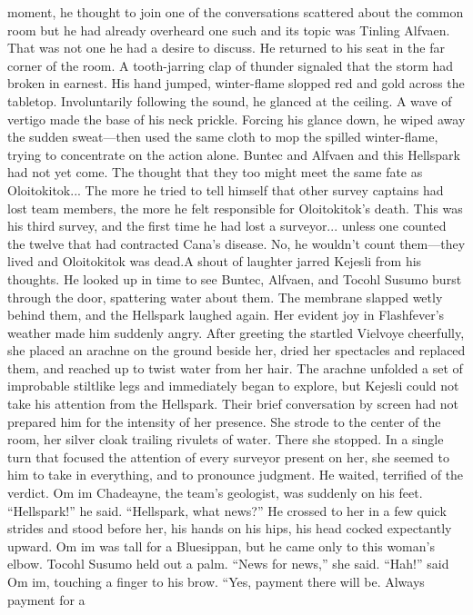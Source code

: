 \documentclass[9pt]{article}
\begin{document}
moment, he thought to join one of the conversations scattered about the common room but he had
already overheard one such and its topic was Tinling Alfvaen. That was not one he had a desire to
discuss. He returned to his seat in the far corner of the room.
A tooth-jarring clap of thunder signaled that the storm had broken in earnest. His hand jumped,
winter-flame slopped red and gold across the tabletop. Involuntarily following the sound, he glanced at
the ceiling. A wave of vertigo made the base of his neck prickle. Forcing his glance down, he wiped
away the sudden sweat—then used the same cloth to mop the spilled winter-flame, trying to concentrate
on the action alone. Buntec and Alfvaen and this Hellspark had not yet come. The thought that they too
might meet the same fate as Oloitokitok...
The more he tried to tell himself that other survey captains had lost team members, the more he felt
responsible for Oloitokitok’s death. This was his third survey, and the first time he had lost a surveyor...
unless one counted the twelve that had contracted Cana’s disease. No, he wouldn’t count them—they
lived and Oloitokitok was dead.A shout of laughter jarred Kejesli from his thoughts. He looked up in time to see Buntec, Alfvaen,
and Tocohl Susumo burst through the door, spattering water about them. The membrane slapped wetly
behind them, and the Hellspark laughed again. Her evident joy in Flashfever’s weather made him
suddenly angry.
After greeting the startled Vielvoye cheerfully, she placed an arachne on the ground beside her, dried
her spectacles and replaced them, and reached up to twist water from her hair. The arachne unfolded a
set of improbable stiltlike legs and immediately began to explore, but Kejesli could not take his attention
from the Hellspark. Their brief conversation by screen had not prepared him for the intensity of her
presence.
She strode to the center of the room, her silver cloak trailing rivulets of water. There she stopped. In
a single turn that focused the attention of every surveyor present on her, she seemed to him to take in
everything, and to pronounce judgment. He waited, terrified of the verdict.
Om im Chadeayne, the team’s geologist, was suddenly on his feet. “Hellspark!” he said. “Hellspark,
what news?” He crossed to her in a few quick strides and stood before her, his hands on his hips, his
head cocked expectantly upward. Om im was tall for a Bluesippan, but he came only to this woman’s
elbow.
Tocohl Susumo held out a palm. “News for news,” she said.
“Hah!” said Om im, touching a finger to his brow. “Yes, payment there will be. Always payment for a
\end{document}

